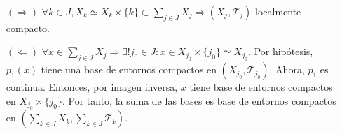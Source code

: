 \begin{dem}
  \begin{enumerate}[label=(\roman*)]
    \item []
    \item [$(\Rightarrow)$] $\forall k \in J, X_{k} \simeq X_{k} \times \{ k \} \subset \sum_{j \in J} X_{j} \Rightarrow ( X_{j}, \mathcal{T}_{j} )$ localmente compacto.
    \item [$(\Leftarrow)$] $\forall x \in \sum_{j \in J} X_{j} \Rightarrow \exists! j_{0} \in J : x \in X_{j_{0}} \times \{ j_{0} \} \simeq X_{j_{0}}$. Por hipótesis, $p_{1}(x)$ tiene una base de entornos compactos en $( X_{j_{0}}, \mathcal{T}_{j_{0}} )$. Ahora, $p_{1}$ es continua. Entonces, por imagen inversa, $x$ tiene base de entornos compactos en $X_{j_{0}} \times \{  j_{0} \}$. Por tanto, la suma de las bases es base de entornos compactos en $( \sum_{k \in J} X_{k}, \sum_{k \in J} \mathcal{T}_{k})$.
  \end{enumerate}
\end{dem}
